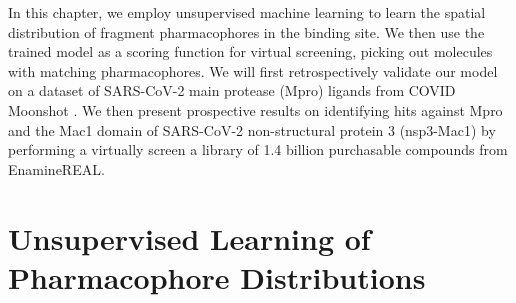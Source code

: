 In this chapter, we employ unsupervised machine learning to learn the spatial distribution of fragment pharmacophores in the binding site. We then use the trained model as a scoring function for virtual screening, picking out molecules with matching pharmacophores. We will first retrospectively validate our model on a dataset of SARS-CoV-2 main protease (Mpro) ligands from COVID Moonshot \cite{Moonshot2022}. We then present prospective results on identifying hits against Mpro and the Mac1 domain of SARS-CoV-2 non-structural protein 3 (nsp3-Mac1) by performing a virtually screen a library of 1.4 billion purchasable compounds from EnamineREAL.



\section{Unsupervised Learning of Pharmacophore Distributions} \label{sec:model}

